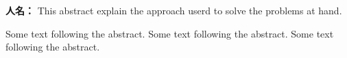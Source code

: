 \documentclass{ctexart}
\newenvironment{duihua}{
	\begin{list}{}{
        \setlength{\topsep}{0pt}        %
        \setlength{\partopsep}{0pt}     %
        \setlength{\parsep}{\parskip}   %
        \setlength{\itemsep}{\lineskip}       %
        \setlength{\labelsep}{0pt}%
        \setlength{\labelwidth}{3em}%
        \setlength{\itemindent}{0pt}%
        \setlength\listparindent{\parindent}
        \setlength{\leftmargin}{3em}
        \setlength{\rightmargin}{0pt}
        }
}{\end{list}}
\begin{document}
\begin{duihua}
\item[\textbf{人名：}] This abstract explain the approach userd to solve the problems at hand.
\end{duihua}

Some text following the abstract. Some text following the abstract. Some text following the abstract.
\end{document}
